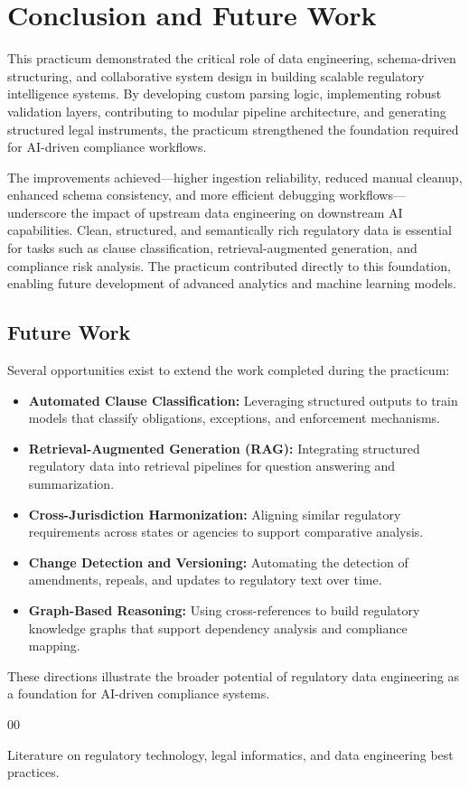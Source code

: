 \documentclass[sigconf]{acmart}
\begin{document}
\section{Conclusion and Future Work}

This practicum demonstrated the critical role of data engineering, schema-driven structuring, and collaborative system design in building scalable regulatory intelligence systems. By developing custom parsing logic, implementing robust validation layers, contributing to modular pipeline architecture, and generating structured legal instruments, the practicum strengthened the foundation required for AI-driven compliance workflows.

The improvements achieved—higher ingestion reliability, reduced manual cleanup, enhanced schema consistency, and more efficient debugging workflows—underscore the impact of upstream data engineering on downstream AI capabilities. Clean, structured, and semantically rich regulatory data is essential for tasks such as clause classification, retrieval-augmented generation, and compliance risk analysis. The practicum contributed directly to this foundation, enabling future development of advanced analytics and machine learning models.

\subsection{Future Work}

Several opportunities exist to extend the work completed during the practicum:

\begin{itemize}
    \item \textbf{Automated Clause Classification:} Leveraging structured outputs to train models that classify obligations, exceptions, and enforcement mechanisms.
    \item \textbf{Retrieval-Augmented Generation (RAG):} Integrating structured regulatory data into retrieval pipelines for question answering and summarization.
    \item \textbf{Cross-Jurisdiction Harmonization:} Aligning similar regulatory requirements across states or agencies to support comparative analysis.
    \item \textbf{Change Detection and Versioning:} Automating the detection of amendments, repeals, and updates to regulatory text over time.
    \item \textbf{Graph-Based Reasoning:} Using cross-references to build regulatory knowledge graphs that support dependency analysis and compliance mapping.
\end{itemize}

These directions illustrate the broader potential of regulatory data engineering as a foundation for AI-driven compliance systems.


\begin{thebibliography}{00}

\bibitem{} Literature on regulatory technology, legal informatics, and data engineering best practices.

\end{thebibliography}
\end{document}
